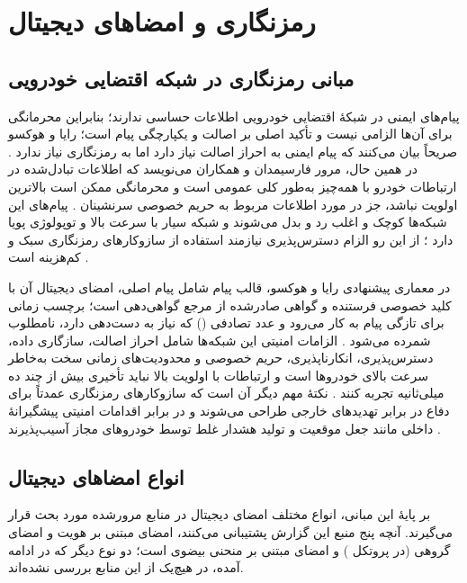 \section{رمزنگاری و امضاهای دیجیتال}

\subsection{مبانی رمزنگاری در شبکه اقتضایی خودرویی}

پیام‌های ایمنی در شبکهٔ اقتضایی خودرویی اطلاعات حساسی ندارند؛ بنابراین محرمانگی برای آن‌ها الزامی نیست و تأکید اصلی بر اصالت و یکپارچگی پیام است؛ رایا و هوکسو صریحاً بیان می‌کنند که پیام ایمنی به احراز اصالت نیاز دارد اما به رمزنگاری نیاز ندارد \cite{SecuringVehicularAd}. در همین حال، مرور فارسیمدان و همکاران می‌نویسد که اطلاعات تبادل‌شده در ارتباطات خودرو با همه‌چیز به‌طور کلی عمومی است و محرمانگی ممکن است بالاترین اولویت نباشد، جز در مورد اطلاعات مربوط به حریم خصوصی سرنشینان \cite{farsimadanReviewSecurityChallenges2025}. پیام‌های این شبکه‌ها کوچک و اغلب رد و بدل می‌شوند و شبکه سیار با سرعت بالا و توپولوژی پویا دارد \cite{farsimadanReviewSecurityChallenges2025}؛ از این رو الزام دسترس‌پذیری نیازمند استفاده از سازوکارهای رمزنگاری سبک و کم‌هزینه است \cite{farsimadanReviewSecurityChallenges2025}.

در معماری پیشنهادی رایا و هوکسو، قالب پیام شامل پیام اصلی، امضای دیجیتال آن با کلید خصوصی فرستنده و گواهی صادرشده از مرجع گواهی‌دهی است؛ برچسب زمانی برای تازگی پیام به کار می‌رود و عدد تصادفی () که نیاز به دست‌دهی دارد، نامطلوب شمرده می‌شود \cite{SecuringVehicularAd}. الزامات امنیتی این شبکه‌ها شامل احراز اصالت، سازگاری داده، دسترس‌پذیری، انکارناپذیری، حریم خصوصی و محدودیت‌های زمانی سخت به‌خاطر سرعت بالای خودروها است \cite{SecuringVehicularAd} و ارتباطات با اولویت بالا نباید تأخیری بیش از چند ده میلی‌ثانیه تجربه کنند \cite{farsimadanReviewSecurityChallenges2025}. نکتهٔ مهم دیگر آن است که سازوکارهای رمزنگاری عمدتاً برای دفاع در برابر تهدیدهای خارجی طراحی می‌شوند و در برابر اقدامات امنیتی پیشگیرانهٔ داخلی مانند جعل موقعیت و تولید هشدار غلط توسط خودروهای مجاز آسیب‌پذیرند \cite{farsimadanReviewSecurityChallenges2025}.

\subsection{انواع امضاهای دیجیتال}

بر پایهٔ این مبانی، انواع مختلف امضای دیجیتال در منابع مرورشده مورد بحث قرار می‌گیرند. آنچه پنج منبع این گزارش پشتیبانی می‌کنند، امضای مبتنی بر هویت و امضای گروهی (در پروتکل ) و امضای مبتنی بر منحنی بیضوی است؛ دو نوع دیگر که در ادامه آمده، در هیچ‌یک از این منابع بررسی نشده‌اند.

